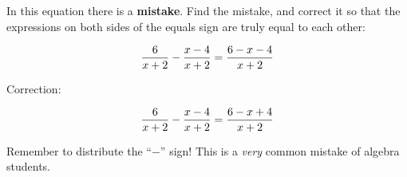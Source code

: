 

In this equation there is a {\bf mistake}.  Find the mistake, and correct it so that the expressions on both sides of the equals sign are truly equal to each other:

$${6 \over x + 2} - {{x - 4} \over {x + 2}} = {{6 - x - 4} \over {x + 2}}$$







Correction:

$${6 \over x + 2} - {{x - 4} \over {x + 2}} = {{6 - x + 4} \over {x + 2}}$$







Remember to distribute the ``$-$'' sign!  This is a {\it very} common mistake of algebra students.




